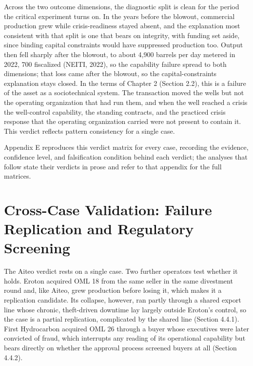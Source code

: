 \documentclass[twoside,fontset=lmodern]{mitthesis}
\begin{document}
Across the two outcome dimensions, the diagnostic split is clean for the
period the critical experiment turns on. In the years before the
blowout, commercial production grew while crisis-readiness stayed
absent, and the explanation most consistent with that split is one that
bears on integrity, with funding set aside, since binding capital
constraints would have suppressed production too. Output then fell
sharply after the blowout, to about 4,900 barrels per day metered in
2022, 700 fiscalized (NEITI, 2022), so the capability failure spread to
both dimensions; that loss came after the blowout, so the
capital-constraints explanation stays closed. In the terms of Chapter 2
(Section 2.2), this is a failure of the asset as a sociotechnical
system. The transaction moved the wells but not the operating
organization that had run them, and when the well reached a crisis the
well-control capability, the standing contracts, and the practiced
crisis response that the operating organization carried were not present
to contain it. This verdict reflects pattern consistency for a single
case.

Appendix E reproduces this verdict matrix for every case, recording the
evidence, confidence level, and falsification condition behind each
verdict; the analyses that follow state their verdicts in prose and
refer to that appendix for the full matrices.

\hypertarget{cross-case-validation-failure-replication-and-regulatory-screening}{%
\section{Cross-Case Validation: Failure Replication and Regulatory
Screening}\label{cross-case-validation-failure-replication-and-regulatory-screening}}

The Aiteo verdict rests on a single case. Two further operators test
whether it holds. Eroton acquired OML 18 from the same seller in the
same divestment round and, like Aiteo, grew production before losing it,
which makes it a replication candidate. Its collapse, however, ran
partly through a shared export line whose chronic, theft-driven downtime
lay largely outside Eroton's control, so the case is a partial
replication, complicated by the shared line (Section 4.4.1). First
Hydrocarbon acquired OML 26 through a buyer whose executives were later
convicted of fraud, which interrupts any reading of its operational
capability but bears directly on whether the approval process screened
buyers at all (Section 4.4.2).
\end{document}
